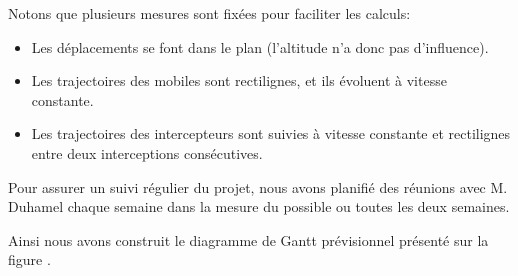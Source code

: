     	Notons que plusieurs mesures sont fixées pour faciliter les calculs:
    	\begin{itemize}
    		\item Les déplacements se font dans le plan (l'altitude n'a donc pas d'influence).
    		\item Les trajectoires des mobiles sont rectilignes, et ils évoluent à vitesse constante.
    		\item Les trajectoires des intercepteurs sont suivies à vitesse constante et rectilignes entre deux interceptions consécutives.
    	\end{itemize}

    	Pour assurer un suivi régulier du projet, nous avons planifié des réunions avec M. Duhamel chaque semaine dans la mesure du possible ou toutes les deux semaines.

    	Ainsi nous avons construit le diagramme de Gantt prévisionnel présenté sur la figure .